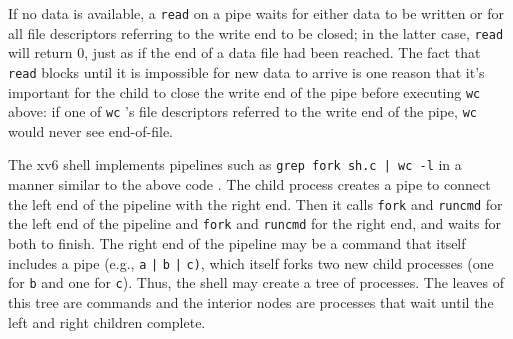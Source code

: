 If no data is available, a
\lstinline{read}
on a pipe waits for either data to be written or for all
file descriptors referring to the write end to be closed;
in the latter case,
\lstinline{read}
will return 0, just as if the end of a data file had been reached.
The fact that
\lstinline{read}
blocks until it is impossible for new data to arrive
is one reason that it's important for the child to
close the write end of the pipe
before executing
\lstinline{wc}
above: if one of
\lstinline{wc} 's
file descriptors referred to the write end of the pipe,
\lstinline{wc}
would never see end-of-file.

The xv6 shell implements pipelines such as
\lstinline{grep fork sh.c | wc -l}
in a manner similar to the above code
.
The child process creates a pipe to connect the left end of the pipeline
with the right end. Then it calls
\lstinline{fork}
and
\lstinline{runcmd}
for the left end of the pipeline
and
\lstinline{fork}
and
\lstinline{runcmd}
for the right end, and waits for both to finish.
The right end of the pipeline may be a command that itself includes a
pipe (e.g.,
\lstinline{a}
\lstinline{|}
\lstinline{b}
\lstinline{|}
\lstinline{c)},
which itself forks two new child processes (one for
\lstinline{b}
and one for
\lstinline{c}).
Thus, the shell may
create a tree of processes.  The leaves of this tree are commands and
the interior nodes are processes that wait until the left and right
children complete.


